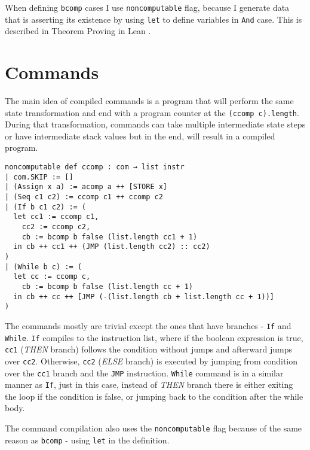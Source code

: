 When defining \lstinline{bcomp} cases I use \lstinline{noncomputable} flag, because I generate data that is asserting its existence by using \lstinline{let} to define variables in \lstinline{And} case. This is described in Theorem Proving in Lean \cite{theorem_proving_in_lean}.

\section{Commands}

The main idea of compiled commands is a program that will perform the same state transformation and end with a program counter at the \lstinline{(ccomp c).length}. During that transformation, commands can take multiple intermediate state steps or have intermediate stack values but in the end, will result in a compiled program.  

\begin{lstlisting}
noncomputable def ccomp : com → list instr
| com.SKIP := []
| (Assign x a) := acomp a ++ [STORE x]
| (Seq c1 c2) := ccomp c1 ++ ccomp c2
| (If b c1 c2) := (
  let cc1 := ccomp c1,
    cc2 := ccomp c2,
    cb := bcomp b false (list.length cc1 + 1)
  in cb ++ cc1 ++ (JMP (list.length cc2) :: cc2)
)
| (While b c) := (
  let cc := ccomp c,
    cb := bcomp b false (list.length cc + 1)
  in cb ++ cc ++ [JMP (-(list.length cb + list.length cc + 1))] 
)
\end{lstlisting}

The commands mostly are trivial except the ones that have branches - \lstinline{If} and \lstinline{While}. \lstinline{If} compiles to the instruction list, where if the boolean expression is true, \lstinline{cc1} (\emph{THEN} branch) follows the condition without jumps and afterward jumps over \lstinline{cc2}. Otherwise, \lstinline{cc2} (\emph{ELSE} branch) is executed by jumping from condition over the \lstinline{cc1} branch and the \lstinline{JMP} instruction. \lstinline{While} command is in a similar manner as \lstinline{If}, just in this case, instead of \emph{THEN} branch there is either exiting the loop if the condition is false, or jumping back to the condition after the while body.

The command compilation also uses the \lstinline{noncomputable} flag because of the same reason as \lstinline{bcomp} - using \lstinline{let} in the definition.


